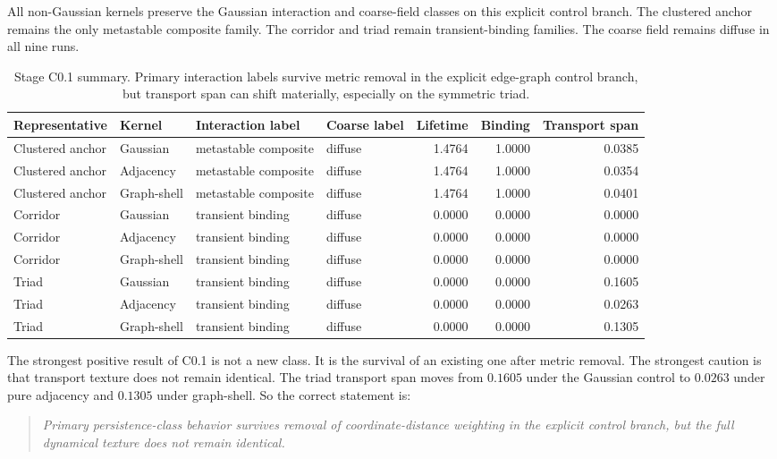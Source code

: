 \documentclass[11pt]{article}
\begin{document}
All non-Gaussian kernels preserve the Gaussian interaction and coarse-field classes on this explicit control branch. The clustered anchor remains the only metastable composite family. The corridor and triad remain transient-binding families. The coarse field remains diffuse in all nine runs.

\begin{table}[t]
\centering
\scriptsize
\begin{tabular}{@{}llllrrr@{}}
\toprule
Representative & Kernel & Interaction label & Coarse label & Lifetime & Binding & Transport span \\
\midrule
Clustered anchor & Gaussian & metastable composite & diffuse & 1.4764 & 1.0000 & 0.0385 \\
Clustered anchor & Adjacency & metastable composite & diffuse & 1.4764 & 1.0000 & 0.0354 \\
Clustered anchor & Graph-shell & metastable composite & diffuse & 1.4764 & 1.0000 & 0.0401 \\
Corridor & Gaussian & transient binding & diffuse & 0.0000 & 0.0000 & 0.0000 \\
Corridor & Adjacency & transient binding & diffuse & 0.0000 & 0.0000 & 0.0000 \\
Corridor & Graph-shell & transient binding & diffuse & 0.0000 & 0.0000 & 0.0000 \\
Triad & Gaussian & transient binding & diffuse & 0.0000 & 0.0000 & 0.1605 \\
Triad & Adjacency & transient binding & diffuse & 0.0000 & 0.0000 & 0.0263 \\
Triad & Graph-shell & transient binding & diffuse & 0.0000 & 0.0000 & 0.1305 \\
\bottomrule
\end{tabular}
\caption{Stage C0.1 summary. Primary interaction labels survive metric removal in the explicit edge-graph control branch, but transport span can shift materially, especially on the symmetric triad.}
\label{tab:c01}
\end{table}

The strongest positive result of C0.1 is not a new class. It is the survival of an existing one after metric removal. The strongest caution is that transport texture does not remain identical. The triad transport span moves from $0.1605$ under the Gaussian control to $0.0263$ under pure adjacency and $0.1305$ under graph-shell. So the correct statement is:
\begin{quote}
\emph{Primary persistence-class behavior survives removal of coordinate-distance weighting in the explicit control branch, but the full dynamical texture does not remain identical.}
\end{quote}
\end{document}

